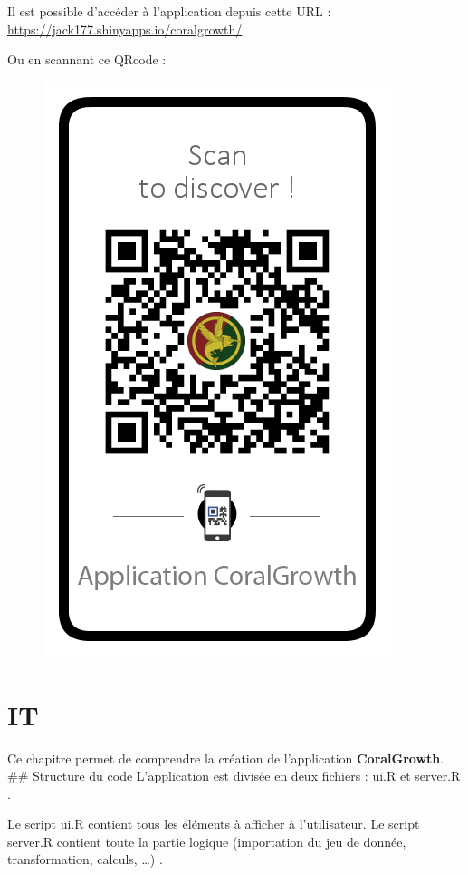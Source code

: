 \documentclass[]{book}
\begin{document}
Il est possible d'accéder à l'application depuis cette URL :
\url{https://jack177.shinyapps.io/coralgrowth/}

Ou en scannant ce QRcode :

\begin{figure}
\centering
\includegraphics{image/QRcode.png}
\caption{}
\end{figure}

\chapter{IT}\label{it}

Ce chapitre permet de comprendre la création de l'application
\textbf{CoralGrowth}. \#\# Structure du code L'application est divisée
en deux fichiers : ui.R et server.R .

Le script ui.R contient tous les éléments à afficher à l'utilisateur. Le
script server.R contient toute la partie logique (importation du jeu de
donnée, transformation, calculs, \ldots{}) .
\end{document}
